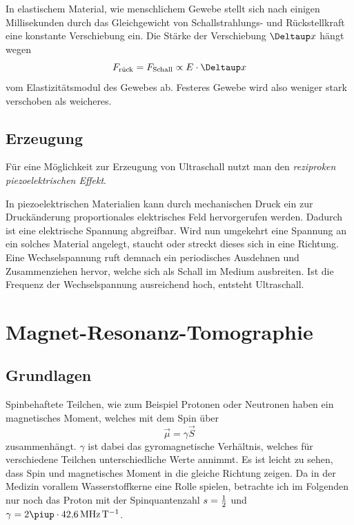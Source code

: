 \documentclass[
    11pt,
    ngerman
]{scrreprt}
\begin{document}
In elastischem Material, wie menschlichem Gewebe stellt sich nach einigen Millisekunden durch das Gleichgewicht von Schallstrahlungs- und Rückstellkraft  eine konstante Verschiebung ein. Die Stärke der Verschiebung $\Deltaup x$ hängt wegen 
\[
    F_\text{rück} = F_\text{Schall} \propto E\cdot\Deltaup x
\]
vom Elastizitätsmodul des Gewebes ab. Festeres Gewebe wird also weniger stark verschoben als weicheres.


\subsection{Erzeugung}

Für eine Möglichkeit zur Erzeugung von Ultraschall nutzt man den
\emph{reziproken piezoelektrischen Effekt}.

In piezoelektrischen Materialien kann durch mechanischen Druck ein zur
Druckänderung proportionales elektrisches Feld hervorgerufen werden. Dadurch
ist eine elektrische Spannung abgreifbar. Wird nun umgekehrt eine Spannung an
ein solches Material angelegt, staucht oder streckt dieses sich in eine
Richtung. Eine Wechselspannung ruft demnach ein periodisches Ausdehnen und
Zusammenziehen hervor, welche sich als Schall im Medium ausbreiten. Ist die
Frequenz der Wechselspannung ausreichend hoch, entsteht Ultraschall.

\section{Magnet-Resonanz-Tomographie}

\subsection{Grundlagen}

Spinbehaftete Teilchen, wie zum Beispiel Protonen oder Neutronen haben ein magnetisches Moment, welches mit dem Spin über
\[
    \vec\mu = \gamma\vec S
\]
zusammenhängt. $\gamma$ ist dabei das gyromagnetische Verhältnis, welches für
verschiedene Teilchen unterschiedliche Werte annimmt. Es ist leicht zu sehen,
dass Spin und magnetisches Moment in die gleiche Richtung zeigen. Da in der
Medizin vorallem Wasserstoffkerne eine Rolle spielen, betrachte ich im
Folgenden nur noch das Proton mit der Spinquantenzahl $s = \frac 12$ und $\gamma =
2\piup\cdot\SI{42.6}{\mega\hertz\per\tesla}$.
\end{document}
